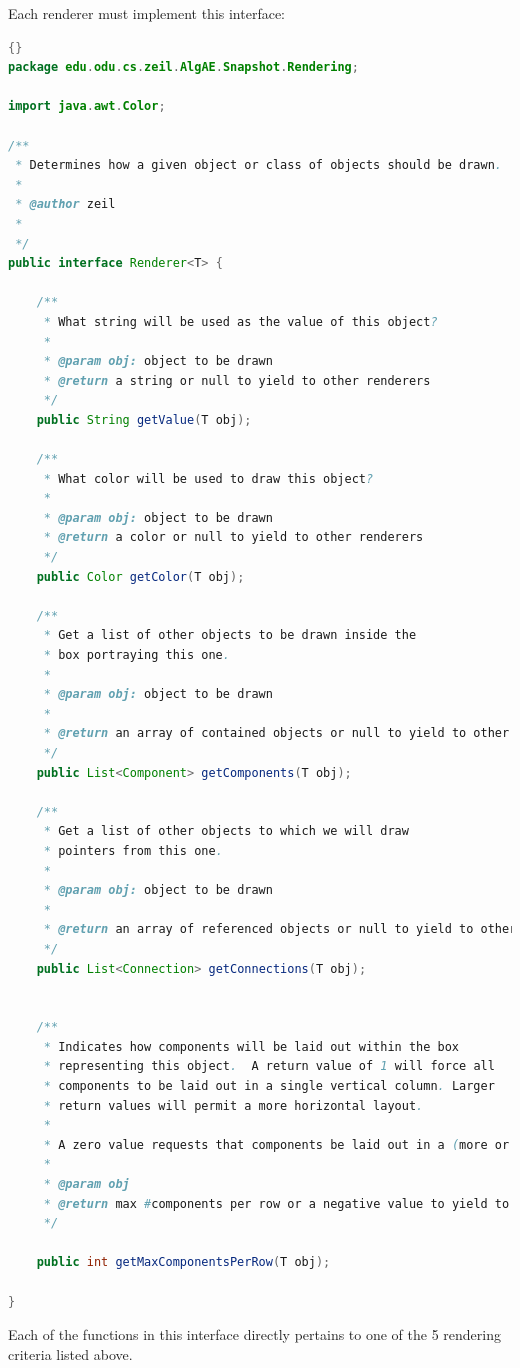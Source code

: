 \documentclass[11pt,titlepage]{book}
\begin{document}
Each renderer must implement this interface:
\begin{lstlisting}[language=Java,frame=tb]{}
package edu.odu.cs.zeil.AlgAE.Snapshot.Rendering;

import java.awt.Color;

/**
 * Determines how a given object or class of objects should be drawn.
 * 
 * @author zeil
 *
 */
public interface Renderer<T> {
	
	/**
	 * What string will be used as the value of this object?
	 * 	
	 * @param obj: object to be drawn
	 * @return a string or null to yield to other renderers
	 */
	public String getValue(T obj);
	
	/**
	 * What color will be used to draw this object?
	 * 	
	 * @param obj: object to be drawn
	 * @return a color or null to yield to other renderers
	 */
	public Color getColor(T obj);
	
	/**
	 * Get a list of other objects to be drawn inside the
	 * box portraying this one.
	 * 	
	 * @param obj: object to be drawn
	 * 
	 * @return an array of contained objects or null to yield to other renderers
	 */
	public List<Component> getComponents(T obj);
	
	/**
	 * Get a list of other objects to which we will draw
	 * pointers from this one.
	 * 	
	 * @param obj: object to be drawn
	 * 
	 * @return an array of referenced objects or null to yield to other renderers
	 */
	public List<Connection> getConnections(T obj);
	

	/**
	 * Indicates how components will be laid out within the box
	 * representing this object.  A return value of 1 will force all
	 * components to be laid out in a single vertical column. Larger
	 * return values will permit a more horizontal layout.
	 * 
	 * A zero value requests that components be laid out in a (more or less) minimal area.
	 * 
	 * @param obj
	 * @return max #components per row or a negative value to yield to other renderers 
	 */
			
	public int getMaxComponentsPerRow(T obj);
	
}
\end{lstlisting}
Each of the functions in this interface directly pertains to one of the 5 rendering criteria listed above.
\end{document}
